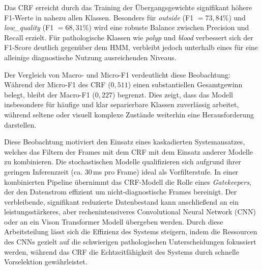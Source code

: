 Das CRF erreicht durch das Training der Übergangsgewichte signifikant höhere F1-Werte in nahezu allen Klassen. Besonders für \textit{outside} (F1 $=73{,}84\%$) und \textit{low\_quality} (F1 $=68{,}31\%$) wird eine robuste Balance zwischen Precision und Recall erzielt. Für pathologische Klassen wie \textit{polyp} und \textit{blood} verbessert sich der F1-Score deutlich gegenüber dem HMM, verbleibt jedoch unterhalb eines für eine alleinige diagnostische Nutzung ausreichenden Niveaus.

Der Vergleich von Macro- und Micro-F1 verdeutlicht diese Beobachtung: Während der Micro-F1 des CRF ($0{,}511$) einen substantiellen Gesamtgewinn belegt, bleibt der Macro-F1 ($0{,}227$) begrenzt. Dies zeigt, dass das Modell insbesondere für häufige und klar separierbare Klassen zuverlässig arbeitet, während seltene oder visuell komplexe Zustände weiterhin eine Herausforderung darstellen.

Diese Beobachtung motiviert den Einsatz eines kaskadierten Systemansatzes, welches das Filtern der Frames mit dem CRF mit dem Einsatz anderer Modelle zu kombinieren. Die stochastischen Modelle qualifizieren sich aufgrund ihrer geringen Inferenzzeit (ca. 30\,ms pro Frame) ideal als Vorfilterstufe. In einer kombinierten Pipeline übernimmt das CRF-Modell die Rolle eines \textit{Gatekeepers}, der den Datenstrom effizient um nicht-diagnostische Frames bereinigt. Der verbleibende, signifikant reduzierte Datenbestand kann anschließend an ein leistungsstärkeres, aber rechenintensiveres Convolutional Neural Network (CNN) oder an ein Vison Transformer Modell übergeben werden. Durch diese Arbeitsteilung lässt sich die Effizienz des Systems steigern, indem die Ressourcen des CNNs gezielt auf die schwierigen pathologischen Unterscheidungen fokussiert werden, während das CRF die Echtzeitfähigkeit des Systems durch schnelle Vorselektion gewährleistet.
